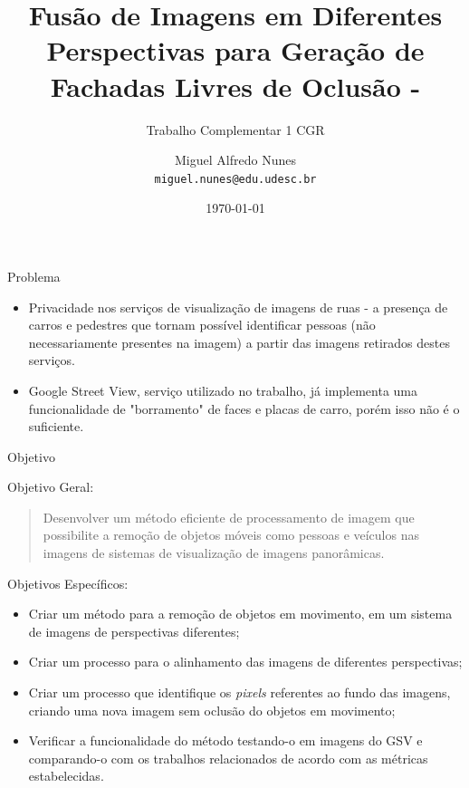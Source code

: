 \documentclass{beamer}
\title{Fusão de Imagens em Diferentes Perspectivas para Geração de Fachadas Livres de Oclusão - \citeonline{Maestri2015}}
\subtitle{Trabalho Complementar 1 CGR}
\author{Miguel Alfredo Nunes\\ \texttt{miguel.nunes@edu.udesc.br}}
\date{\today}
\begin{document}
    \begin{frame}
        \titlepage
    \end{frame}
    
    \begin{frame}[allowframebreaks]{Problema}
        
        \begin{itemize}
            \item Privacidade nos serviços de visualização de imagens de ruas - a presença de carros e pedestres que tornam possível identificar pessoas (não necessariamente presentes na imagem) a partir das imagens retirados destes serviços.
            
            \item Google Street View, serviço utilizado no trabalho, já implementa uma funcionalidade de "borramento" de faces e placas de carro, porém isso não é o suficiente.
            
        \end{itemize}
        
        
    \end{frame}
    
    \begin{frame}{Objetivo}
    
        Objetivo Geral:
        \begin{quote}
            Desenvolver um método eficiente de processamento de imagem que possibilite a remoção de objetos móveis como pessoas e veículos nas imagens de sistemas de visualização de imagens panorâmicas.
        \end{quote}
        
        Objetivos Específicos:
        
        \begin{itemize}[label=\textbullet]
            \item <1-> Criar um método para a remoção de objetos em movimento, em um sistema de imagens de perspectivas diferentes;
            
            \item <2-> Criar um processo para o alinhamento das imagens de diferentes perspectivas;
            
            \item <3-> Criar um processo que identifique os \textit{pixels} referentes ao fundo das imagens, criando uma nova imagem sem oclusão do objetos em movimento;
            
            \item <4-> Verificar a funcionalidade do método testando-o em imagens do GSV e comparando-o com os trabalhos relacionados de acordo com as métricas estabelecidas.
        \end{itemize}
        
    \end{frame}
    
\end{document}
